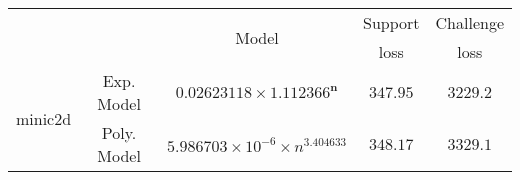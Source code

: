 \begin{tabular}{ccccc} 
\hline 
 &  & \multirow{2}{*}{Model} & Support & Challenge\tabularnewline 
 &  &  & loss  & loss\tabularnewline 
\hline 
\hline 
\multirow{2}{*}{minic2d} & Exp. Model & $\mathbf{0.02623118\times 1.112366^{n}}$ & $\mathbf{347.95}$ & $\mathbf{3229.2}$ \tabularnewline 
 & Poly. Model & $5.986703\times10^{-6}\times n^{3.404633}$ & $348.17$ & $3329.1$ \tabularnewline 
\hline 
\end{tabular} 

